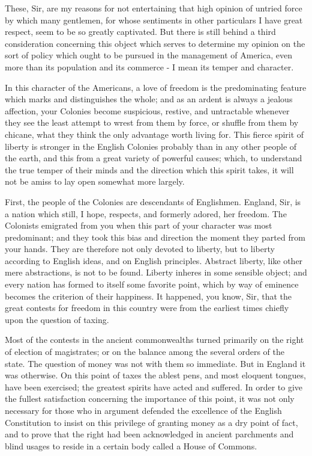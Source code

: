 These, Sir, are my reasons for not entertaining that high opinion of untried force by which many gentlemen, for whose sentiments in other particulars I have great respect, seem to be so greatly captivated. But there is still behind a third consideration concerning this object which serves to determine my opinion on the sort of policy which ought to be pursued in the management of America, even more than its population and its commerce - I mean its temper and character.\par

In this character of the Americans, a love of freedom is the predominating feature which marks and distinguishes the whole; and as an ardent is always a jealous affection, your Colonies become suspicious, restive, and untractable whenever they see the least attempt to wrest from them by force, or shuffle from them by chicane, what they think the only advantage worth living for. This fierce spirit of liberty is stronger in the English Colonies probably than in any other people of the earth, and this from a great variety of powerful causes; which, to understand the true temper of their minds and the direction which this spirit takes, it will not be amiss to lay open somewhat more largely.\par

First, the people of the Colonies are descendants of Englishmen. England, Sir, is a nation which still, I hope, respects, and formerly adored, her freedom. The Colonists emigrated from you when this part of your character was most predominant; and they took this bias and direction the moment they parted from your hands. They are therefore not only devoted to liberty, but to liberty according to English ideas, and on English principles. Abstract liberty, like other mere abstractions, is not to be found. Liberty inheres in some sensible object; and every nation has formed to itself some favorite point, which by way of eminence becomes the criterion of their happiness. It happened, you know, Sir, that the great contests for freedom in this country were from the earliest times chiefly upon the question of taxing.\par

Most of the contests in the ancient commonwealths turned primarily on the right of election of magistrates; or on the balance among the several orders of the state. The question of money was not with them so immediate. But in England it was otherwise. On this point of taxes the ablest pens, and most eloquent tongues, have been exercised; the greatest spirits have acted and suffered. In order to give the fullest satisfaction concerning the importance of this point, it was not only necessary for those who in argument defended the excellence of the English Constitution to insist on this privilege of granting money as a dry point of fact, and to prove that the right had been acknowledged in ancient parchments and blind usages to reside in a certain body called a House of Commons.\par

